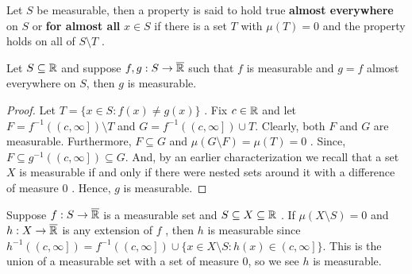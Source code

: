 \begin{definition}
	Let \(S\)	 be measurable, then a property is  said to hold true \textbf{almost everywhere} on \(S\)	 or \textbf{for almost all}	 \(x \in S\)	if there is a set \(T\)	 with \(\mu\left( T \right) = 0\)	 and the property holds on all of \(S \setminus T\)	.
\end{definition}
\begin{proposition}
	Let \(S \subseteq \mathbb{R}\) and suppose \(f, g: S \to \overline{\mathbb{R}}\) such that \(f\) is measurable and \(g=f\) almost everywhere on \(S\), then \(g\)  is measurable.
\end{proposition}
\begin{proof}
	Let \(T = \{x\in S : f\left( x \right)  \neq g\left( x \right) \} \) . Fix \(c \in \mathbb{R}\)  and let \(F = f^{-1}\left( \left( c, \infty \right] \right) \setminus T\)  and \(G = f^{-1}\left( \left( c, \infty \right]\right) \cup T \). Clearly, both \(F\)  and \(G\)  are measurable. Furthermore, \(F \subseteq G\)  and \( \mu\left( G \setminus F \right) = \mu\left( T \right) = 0\) . Since, \(F \subseteq g^{-1}\left( \left( c, \infty \right]  \right)  \subseteq G\). And, by an earlier characterization we recall that a set \(X\)  is measurable if and only if there were nested sets around it with a difference of measure \(0\) . Hence, \(g\)  is measurable.
\end{proof}
\begin{remark}
	Suppose \(f: S \to \overline{\mathbb{R}}\)  is a measurable set and \(S \subseteq X \subseteq \mathbb{R}\) . If \(\mu (X \setminus S) = 0 \)  and \(h: X \to \overline{\mathbb{R}}\)  is any extension of \(f\) , then \(h\)  is measurable since \(h^{-1}\left( \left( c, \infty \right]  \right)  = f^{-1}\left( \left( c, \infty \right]  \right)  \cup \{x \in X \setminus S : h\left( x \right)  \in \left( c, \infty \right] \} \). This is the union of a measurable set with a set of measure \(0\),  so we see \(h\)  is measurable.
\end{remark}

